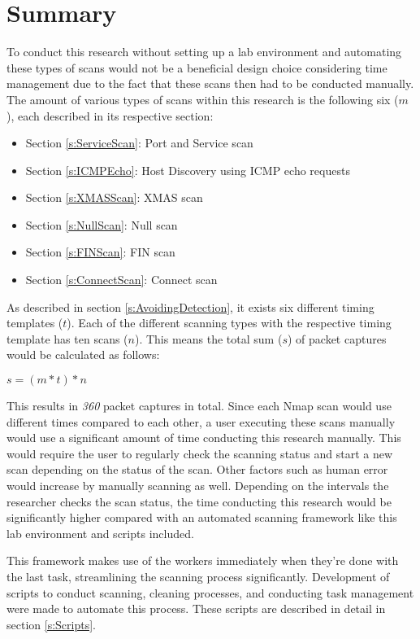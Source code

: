 \section{Summary}
\label{s:DesignImplementSummary}
To conduct this research without setting up a lab environment and automating these types of scans would not be a beneficial design choice considering time management due to the fact that these scans then had to be conducted manually.
The amount of various types of scans within this research is the following six ($m$), each described in its respective section:
\begin{itemize}
    \item Section \ref{s:ServiceScan}: Port and Service scan
    \item Section \ref{s:ICMPEcho}: Host Discovery using ICMP echo requests
    \item Section \ref{s:XMASScan}: XMAS scan
    \item Section \ref{s:NullScan}: Null scan
    \item Section \ref{s:FINScan}: FIN scan
    \item Section \ref{s:ConnectScan}: Connect scan
\end{itemize}

As described in section \ref{s:AvoidingDetection}, it exists six different timing templates ($t$). Each of the different scanning types with the respective timing template has ten scans ($n$).
This means the total sum ($s$) of packet captures would be calculated as follows:

$s = (m * t) * n$

This results in \textit{360} packet captures in total.
Since each Nmap scan would use different times compared to each other, a user executing these scans manually would use a significant amount of time conducting this research manually.
This would require the user to regularly check the scanning status and start a new scan depending on the status of the scan.
Other factors such as human error would increase by manually scanning as well. Depending on the intervals the researcher checks the scan status, the time conducting this research would be significantly higher compared with an automated scanning framework like this lab environment and scripts included.

This framework makes use of the workers immediately when they're done with the last task, streamlining the scanning process significantly.
Development of scripts to conduct scanning, cleaning processes, and conducting task management were made to automate this process.
These scripts are described in detail in section \ref{s:Scripts}.

